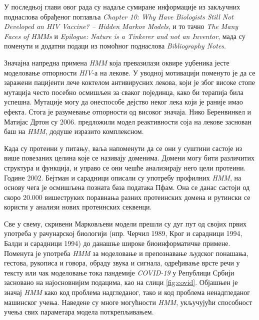 \documentclass[12pt,oneside]{memoir}
\begin{document}
\begin{CJK}{UTF8}{ipxm}
У последњој глави овог рада су надаље сумиране информације из закључних поднаслова обрађеног поглавља \textit{Chapter 10: Why Have Biologists Still Not Developed an HIV Vaccine? -- Hidden Markov Models}, и то тачно \textit{The Many Faces of HMMs} и \textit{Epilogue: Nature is a Tinkerer and not an Inventor}, мада су поменути и додатни подаци из помоћног поднаслова \textit{Bibliography Notes}.

Значајна напредна примена \textit{HMM} која превазилази оквире уџбеника јесте моделовање отпорности \textit{HIV}-а на лекове. У уводној мотивацији поменуто је да се заражени пацијенти лече коктелом антивирусних лекова, који је због високе стопе мутација често посебно осмишљен за сваког појединца, како би терапија била успешна. Мутације могу да онеспособе дејство неког лека који је раније имао ефекта. Стога је разумевање отпорности од високог значаја. Нико Беренвинкел и Матијас Дртон су 2006. предложили модел реактивности соја на лекове заснован баш на \textit{HMM}, додуше изразито комплексном\cite{beerenwinkel2007}.

Када су протеини у питању, ваља напоменути да се они у суштини састоје из више повезаних целина које се називају доменима. Домени могу бити различитих структура и функција, и управо се они чешће анализирају него цели протеини. Године 2002. Бејтман и сарадници описали су употребу профилних \textit{HMM}, на основу чега је осмишљена позната база података Пфам\cite{bateman2002}. Она се данас састоји од скоро 20.000 вишеструких поравнања разних протеинских домена и рутински се користи у анализи нових протеинских секвенци\cite{pfam}.

Све у свему, скривени Марковљеви модели прешли су дуг пут од својих првих употреба у рачунарској биологији (нпр. Черчил 1989\cite{churchill1989}, Крог и сарадници 1994\cite{krogh1994}, Балди и сарадници 1994\cite{baldi1994}) до данашње широке биоинформатичке примене. Поменута је употреба \textit{HMM} за моделовање и препознавање људског понашања, гестова, рукописа и говора, обраду звука и сигнала, одређивање врсте речи у тексту или чак моделовање тока пандемије \textit{COVID-19} у Републици Србији засновано на најосновнијим подацима, као на слици \ref{fig:covid}. Објашњен је значај \textit{HMM} како код проблема надгледаног, тако и код проблема ненадгледаног машинског учења. Наведене су многе могућности \textit{HMM}, укључујући способност учења свих параметара модела поткрепљивањем.


\end{CJK}
\end{document}
